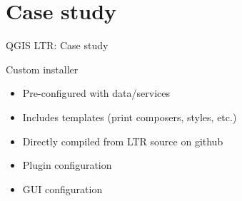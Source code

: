 \section{Case study}
\begin{frame}{QGIS LTR: Case study}
	\begin{block}{Custom installer}
		\begin{itemize}
			\item Pre-configured with data/services
			\item Includes templates (print composers, styles, etc.)
			\item Directly compiled from LTR source on github
			\item Plugin configuration
			\item GUI configuration
		\end{itemize}
	\end{block}
\end{frame}